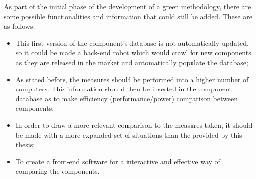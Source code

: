         As part of the initial phase of the development of a green methodology, there are some possible functionalities and information that could still be added. These are as follows:
    \begin{itemize}
	    \item This first version of the component's database is not automatically updated, so it could be made a back-end robot which would crawl for new components as they are released in the market and automatically populate the database;
	    \item As stated before, the measures should be performed into a higher number of computers. This information should then be inserted in the component database as to make efficiency (performance/power) comparison between components;
	    \item In order to draw a more relevant comparison to the measures taken, it should be made with a more expanded set of situations than the provided by this thesis;
	    \item To create a front-end software for a interactive and effective way of comparing the components.
    \end{itemize}







